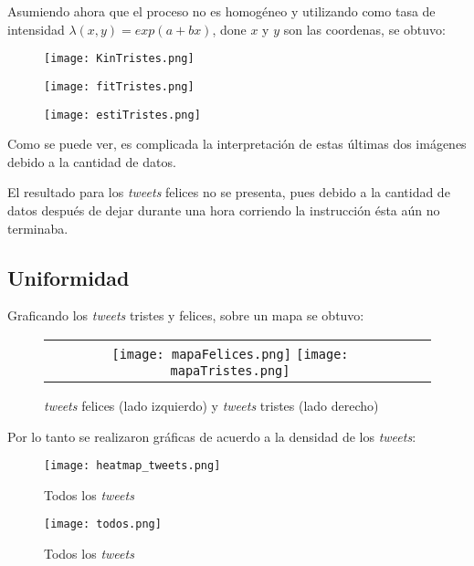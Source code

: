 \documentclass{article}
\begin{document}
\newpage
%
\noindent Asumiendo ahora que el proceso no es homogéneo y utilizando como tasa de intensidad $\lambda(x,y) = exp(a + bx)$, done $x$ y $y$ son las coordenas, se obtuvo:

\begin{figure}[h!]
\centering
\texttt{[image: KinTristes.png]}
\end{figure}


\begin{figure}[h!]
\centering
\texttt{[image: fitTristes.png]}
\end{figure}

\newpage

\begin{figure}[h!]
\centering
\texttt{[image: estiTristes.png]}
\end{figure}

\noindent Como se puede ver, es complicada la interpretación de estas últimas dos imágenes debido a la cantidad de datos.

\noindent El resultado para los \emph{tweets} felices no se presenta, pues debido a la cantidad de datos después de dejar durante una hora corriendo la instrucción ésta aún no terminaba.


\subsection{Uniformidad}

	Graficando los \emph{tweets} tristes y felices, sobre un mapa se obtuvo:



\begin{figure}[h!]
\centering
\begin{tabular}{cc}
   \texttt{[image: mapaFelices.png]}
   \texttt{[image: mapaTristes.png]}
\end{tabular}
\caption{\emph{tweets} felices (lado izquierdo) y \emph{tweets} tristes (lado derecho)}
\end{figure}

\newpage

\noindent Por lo tanto se realizaron gráficas de acuerdo a la densidad de los \emph{tweets}:

\begin{figure}[h!]
\centering
\texttt{[image: heatmap\_tweets.png]}
\caption{Todos los \emph{tweets}}
\end{figure}

\begin{figure}[h!]
\centering
\texttt{[image: todos.png]}
\caption{Todos los \emph{tweets}}
\end{figure}
\end{document}
